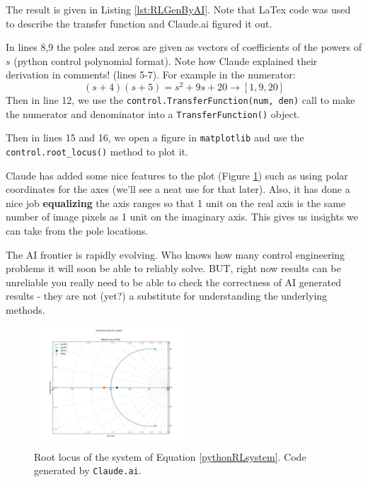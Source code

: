 The result is given in Listing \ref{lst:RLGenByAI}.
Note that LaTex code was used to describe the transfer function and Claude.ai figured it out.

In lines 8,9 the poles and zeros are given as vectors of  coefficients of the powers of $s$ (python control polynomial format).
Note how Claude explained their
derivation in comments! (lines 5-7).  For example in the
numerator:
\[
(s+4)(s+5) = s^2 + 9s + 20 \to [1, 9, 20]
\]
Then in line 12,
we use the {\tt control.TransferFunction(num, den)}  call to make the numerator and denominator into
a {\tt TransferFunction()} object.

Then in lines 15 and 16, we open a figure in {\tt matplotlib} and use the
{\tt control.root\_locus()} method to plot it.


Claude has added some nice features to the plot (Figure \ref{pythonRLoutput})
such as using polar coordinates
for the axes (we'll see a neat use for that later).   Also, it has done a nice job
{\bf equalizing} the axis ranges so that 1 unit on the real axis is the same number
    of image pixels as 1 unit on the imaginary axis.  This gives us insights we can
    take from the pole locations.

The AI frontier is rapidly evolving.  Who knows how many control engineering problems it will soon be able
to reliably solve.  BUT, right now results can be unreliable you really need to be able to check the correctness
of AI generated results - they are not (yet?) a substitute for understanding the underlying methods.

%
%
%


\begin{figure}[b]
    \includegraphics[width=0.5\textwidth]{figs08/B31H79.png}
    \caption{Root locus of the system of Equation \ref{pythonRLsystem}. Code generated by {\tt Claude.ai}.}\label{pythonRLoutput}
\end{figure}

